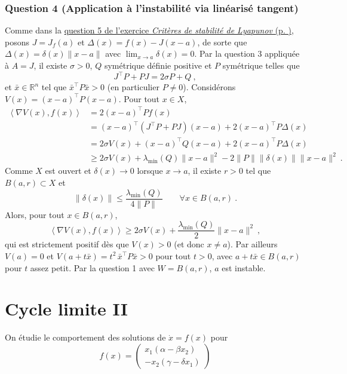 \hypertarget{answer-instab-4}{%
\subsubsection*{Question 4 (Application à l'instabilité via linéarisé
tangent)}\label{answer-instab-4}}


Comme dans la \protect\hyperlink{answer-lyap-5}{question 5 de l'exercice
\emph{Critères de stabilité de Lyapunov} (p. \pageref*{answer-lyap-5})},
posons \(J=J_f(a)\) et \(\Delta(x) = f(x) - J(x-a)\), de sorte que
\(\Delta(x)=\delta(x)\|x-a\|\) avec \(\lim_{x\to a}\delta(x)=0\). Par la
question 3 appliquée à \(A=J\), il existe \(\sigma>0\), \(Q\) symétrique
définie positive et \(P\) symétrique telles que \[
J^\top P + PJ = 2\sigma P + Q \ ,
\] et \(\bar{x}\in\mathbb{R}^n\) tel que \(\bar{x}^\top P \bar{x}>0\)
(en particulier \(P\neq 0\)). Considérons
\(V(x) = (x-a)^\top P (x-a)\). Pour tout \(x\in X\), \begin{align*}
\left< \nabla V(x), f(x) \right> & = 2(x-a)^\top P f(x) \\
&= (x-a)^\top\left( J^\top P +P J\right) (x-a) + 2 (x-a)^\top P\Delta(x) \\
&= 2\sigma V(x) + (x-a)^\top Q (x-a) + 2 (x-a)^\top P\Delta(x) \\
&\geq 2\sigma V(x) + \lambda_{\min}(Q)\|x-a\|^2 - 2 \|P\|  \|\delta(x) \| \|x-a\|^2 \ .
\end{align*} Comme \(X\) est ouvert et \(\delta(x)\to 0\) lorsque
\(x\to a\), il existe \(r>0\) tel que \(B(a,r)\subset X\) et \[
\|\delta(x) \| \leq  \frac{\lambda_{\min}(Q)}{4\|P\|}  \qquad \forall x\in B(a,r) \ .
\] Alors, pour tout \(x\in B(a,r)\), \[
\left< \nabla V(x), f(x) \right> \geq 2\sigma V(x) + \frac{\lambda_{\min}(Q)}{2}\|x-a\|^2 \ ,
\] qui est strictement positif dès que \(V(x)>0\) (et donc \(x\neq a\)).
Par ailleurs \(V(a)=0\) et \(V(a+t\bar{x}) = t^2\,\bar{x}^\top P \bar{x}>0\)
pour tout \(t>0\), avec \(a+t\bar{x}\in B(a,r)\) pour \(t\) assez
petit. Par la question 1 avec \(W=B(a,r)\), \(a\) est instable.

\hypertarget{correc_cycle_lim_volterra}{%
\section{Cycle limite II}\label{correc_cycle_lim_volterra}}

On étudie le comportement des solutions de \(\dot{x}=f(x)\) pour \[
f(x) = 
\left(
\begin{matrix}
x_1(\alpha -\beta x_2)  \\
-x_2(\gamma-\delta x_1)
\end{matrix}
\right)
\]


